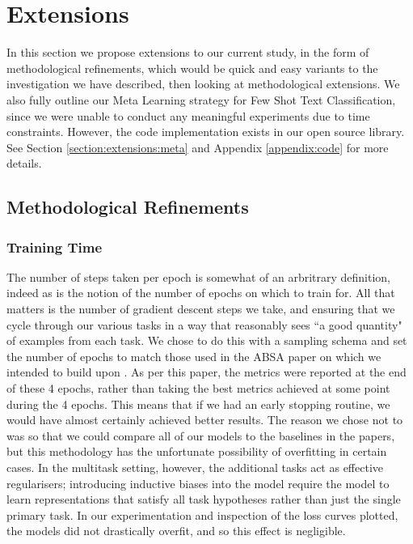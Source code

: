 
\chapter{Extensions} \label{chapter:extensions}

In this section we propose extensions to our current study, in the form of methodological refinements, which would be quick and easy variants to the investigation we have described, then looking at methodological extensions. We also fully outline our Meta Learning strategy for Few Shot Text Classification, since we were unable to conduct any meaningful experiments due to time constraints. However, the code implementation exists in our open source library. See Section \ref{section:extensions:meta} and Appendix \ref{appendix:code} for more details.

\section{Methodological Refinements}

\subsection{Training Time} \label{section:extensions:numstepsperepoch}
The number of steps taken per epoch is somewhat of an arbritrary definition, indeed as is the notion of the number of epochs on which to train for. All that matters is the number of gradient descent steps we take, and ensuring that we cycle through our various tasks in a way that reasonably sees ``a good quantity" of examples from each task. We chose to do this with a sampling schema and set the number of epochs to match those used in the ABSA paper on which we intended to build upon \cite{Sun2019}. As per this paper, the metrics were reported at the end of these 4 epochs, rather than taking the best metrics achieved at some point during the 4 epochs. This means that if we had an early stopping routine, we would have almost certainly achieved better results. The reason we chose not to was so that we could compare all of our models to the baselines in the papers, but this methodology has the unfortunate possibility of overfitting in certain cases. In the multitask setting, however, the additional tasks act as effective regularisers; introducing inductive biases into the model require the model to learn representations that satisfy all task hypotheses rather than just the single primary task. In our experimentation and inspection of the loss curves plotted, the models did not drastically overfit, and so this effect is negligible.

